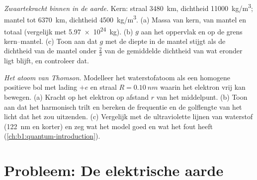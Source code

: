 \begin{exercise}[$\star\star\star$]\label{exo:b1:electrostatics-gauss:11}
\emph{Zwaartekracht binnen in de aarde.} Kern: straal \qty{3480}{km}, dichtheid
\qty{11000}{kg/m^3}; mantel tot \qty{6370}{km}, dichtheid \qty{4500}{kg/m^3}.
(a) Massa van kern, van mantel en totaal (vergelijk met \qty{5.97e24}{kg}).
(b) $g$ aan het oppervlak en op de grens kern--mantel. (c) Toon aan dat
$g$ met de diepte in de mantel stijgt als de dichtheid van de mantel onder
$\tfrac23$ van de gemiddelde dichtheid van wat eronder ligt blijft, en controleer dat.
\end{exercise}

\begin{exercise}[$\star\star\star$]\label{exo:b1:electrostatics-gauss:12}
\emph{Het atoom van Thomson.} Modelleer het waterstofatoom als een homogene positieve
bol met lading $+e$ en straal $R = \qty{0.10}{nm}$ waarin het elektron
vrij kan bewegen. (a) Kracht op het elektron op afstand $r$ van het middelpunt.
(b) Toon aan dat het harmonisch trilt en bereken de frequentie en
de golflengte van het licht dat het zou uitzenden. (c) Vergelijk met de
ultraviolette lijnen van waterstof (\qty{122}{nm} en korter) en zeg
wat het model goed en wat het fout heeft (\cref{ch:b1:quantum-introduction}).
\end{exercise}

\section{Probleem: De elektrische aarde}

